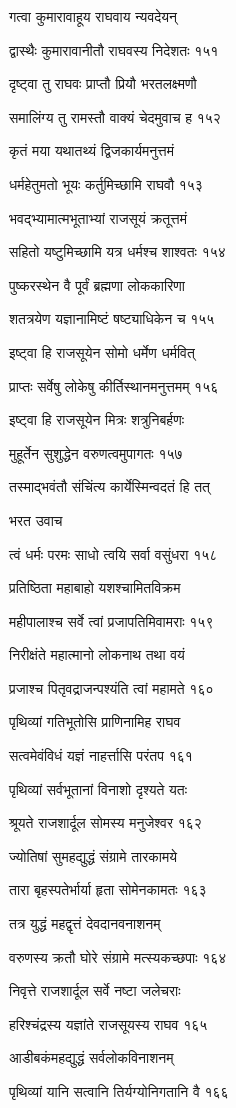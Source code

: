 गत्वा कुमारावाहूय राघवाय न्यवदेयन्

द्वास्थैः कुमारावानीतौ राघवस्य निदेशतः १५१

दृष्ट्वा तु राघवः प्राप्तौ प्रियौ भरतलक्ष्मणौ

समालिंग्य तु रामस्तौ वाक्यं चेदमुवाच ह १५२

कृतं मया यथातथ्यं द्विजकार्यमनुत्तमं

धर्महेतुमतो भूयः कर्तुमिच्छामि राघवौ १५३

भवद्भ्यामात्मभूताभ्यां राजसूयं क्रतूत्तमं

सहितो यष्टुमिच्छामि यत्र धर्मश्च शाश्वतः १५४

पुष्करस्थेन वै पूर्वं ब्रह्मणा लोककारिणा

शतत्रयेण यज्ञानामिष्टं षष्ट्याधिकेन च १५५

इष्ट्वा हि राजसूयेन सोमो धर्मेण धर्मवित्

प्राप्तः सर्वेषु लोकेषु कीर्तिस्थानमनुत्तमम् १५६

इष्ट्वा हि राजसूयेन मित्रः शत्रुनिबर्हणः

मुहूर्तेन सुशुद्धेन वरुणत्वमुपागतः १५७

तस्माद्भवंतौ संचिंत्य कार्येस्मिन्वदतं हि तत्

भरत उवाच

त्वं धर्मः परमः साधो त्वयि सर्वा वसुंधरा १५८

प्रतिष्ठिता महाबाहो यशश्चामितविक्रम

महीपालाश्च सर्वे त्वां प्रजापतिमिवामराः १५९

निरीक्षंते महात्मानो लोकनाथ तथा वयं

प्रजाश्च पितृवद्राजन्पश्यंति त्वां महामते १६०

पृथिव्यां गतिभूतोसि प्राणिनामिह राघव

सत्वमेवंविधं यज्ञं नाहर्त्तासि परंतप १६१

पृथिव्यां सर्वभूतानां विनाशो दृश्यते यतः

श्रूयते राजशार्दूल सोमस्य मनुजेश्वर १६२

ज्योतिषां सुमहद्युद्धं संग्रामे तारकामये

तारा बृहस्पतेर्भार्या हृता सोमेनकामतः १६३

तत्र युद्धं महद्वृत्तं देवदानवनाशनम्

वरुणस्य क्रतौ घोरे संग्रामे मत्स्यकच्छपाः १६४

निवृत्ते राजशार्दूल सर्वे नष्टा जलेचराः

हरिश्चंद्रस्य यज्ञांते राजसूयस्य राघव १६५

आडीबकंमहद्युद्धं सर्वलोकविनाशनम्

पृथिव्यां यानि सत्वानि तिर्यग्योनिगतानि वै १६६

